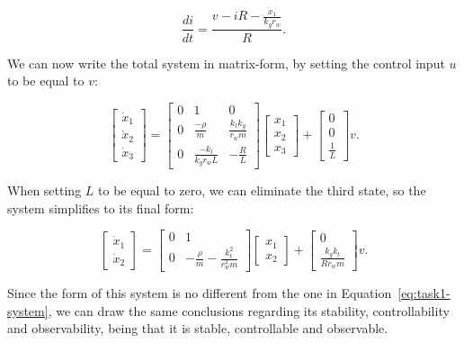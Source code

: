 \documentclass[11pt,titlepage]{report}
\begin{document}
\begin{equation}\label{eq-task2-didt}
    \frac{di}{dt} = \frac{v-iR-\frac{\dot{x}_1}{k_g r_w}}{R}.
\end{equation}

We can now write the total system in matrix-form, by setting the control input $u$ to be equal to $v$:

\begin{equation}
    \begin{bmatrix}
        \dot{x}_1 \\ 
        \dot{x}_2 \\
        \dot{x}_3
    \end{bmatrix} = 
    \begin{bmatrix}
        0 & 1 & 0 \\
        0 & \frac{-\rho}{m} & \frac{k_{t}k_{g}}{r_{w}m} \\
        0 & \frac{-k_{t}}{k_{g} r_{w} L} & -\frac{R}{L}
    \end{bmatrix}
    \begin{bmatrix}
        x_1 \\
        x_2 \\
        x_3
    \end{bmatrix} + 
    \begin{bmatrix}
        0 \\ 
        0 \\
        \frac{1}{L}
    \end{bmatrix}v.
\end{equation}

When setting $L$ to be equal to zero, we can eliminate the third state, so the system simplifies to its final form:

\begin{equation}
    \begin{bmatrix}
        \dot{x}_1 \\ 
        \dot{x}_2
    \end{bmatrix} = 
    \begin{bmatrix}
        0 & 1 \\
        0 & -\frac{\rho}{m} - \frac{k_t^2}{r_w^2m}
    \end{bmatrix}
    \begin{bmatrix}
        x_1 \\ 
        x_2
    \end{bmatrix} +
    \begin{bmatrix}
        0 \\ 
        \frac{k_g k_t}{R r_w m}
    \end{bmatrix}v.
\end{equation}

Since the form of this system is no different from the one in Equation~\ref{eq:task1-system}, we can draw the same conclusions regarding its stability, controllability and observability, being that it is stable, controllable and observable.
\end{document}
